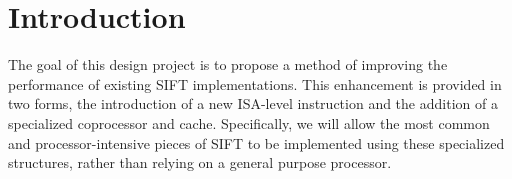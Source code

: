 \section{Introduction}
The goal of this design project is to propose a method of improving the performance of existing SIFT implementations. This enhancement is provided in two forms, the introduction of a new ISA-level instruction and the addition of a specialized coprocessor and cache. Specifically, we will allow the most common and processor-intensive pieces of SIFT to be implemented using these specialized structures, rather than relying on a general purpose processor. 

